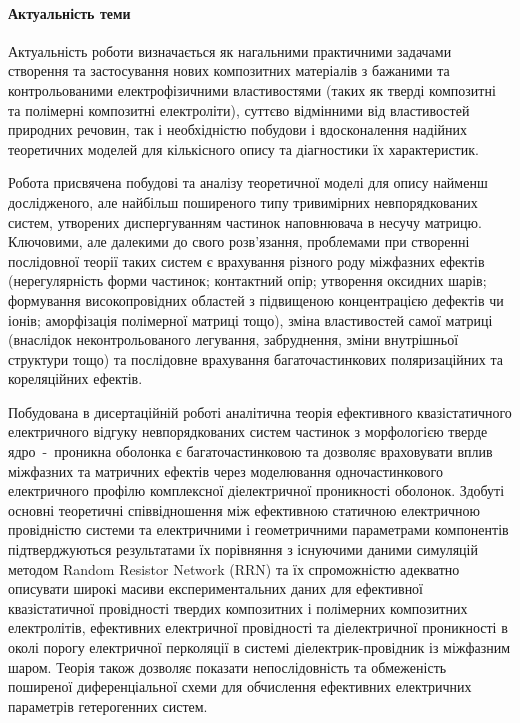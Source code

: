 
\paragraph{Актуальність теми}\hfill\par
Актуальність роботи визначається як нагальними практичними 
задачами створення та застосування нових композитних матеріалів 
з бажаними та контрольованими електрофізичними властивостями 
(таких як тверді композитні та полімерні композитні електроліти), 
суттєво відмінними від властивостей природних речовин, так і 
необхідністю побудови і вдосконалення надійних теоретичних 
моделей для кількісного опису та діагностики їх характеристик. 

Робота присвячена побудові та аналізу теоретичної моделі для 
опису найменш дослідженого, але найбільш поширеного типу 
тривимірних невпорядкованих систем, утворених диспергуванням 
частинок наповнювача в несучу матрицю. Ключовими, але
далекими до свого розв'язан\-ня, проблемами при створенні послідовної 
теорії таких систем є врахування різного роду міжфазних 
ефектів (нерегулярність форми частинок; контактний опір; 
утворення оксидних шарів; формування високопровідних областей 
з підвищеною концентрацією дефектів чи іонів; аморфізація 
полімерної матриці тощо), зміна властивостей самої матриці 
(внаслідок неконтрольованого легування, забруднення, зміни 
внутрішньої структури тощо) та послідовне врахування 
багаточастинкових поляризаційних та кореляційних ефектів.

Побудована в дисертаційній роботі аналітична теорія ефективного 
квазістатичного електричного відгуку невпорядкованих систем
частинок з морфологією тверде ядро~-~проникна оболонка є 
багаточастинковою та дозволяє враховувати вплив міжфазних 
та матричних ефектів через моделювання одночастинкового 
електричного профілю комплексної діелектричної проникності 
оболонок. Здобуті основні теоретичні співвідношення між 
ефективною статичною електричною провідністю системи та 
електричними і геометричними параметрами компонентів 
підтверджуються результатами їх порівняння з існуючими даними 
симуляцій методом Random Resistor Network (RRN) та їх спроможністю 
адекватно описувати широкі масиви експериментальних даних 
для ефективної квазістатичної провідності твердих композитних 
і полімерних композитних електролітів, ефективних електричної 
провідності та діелектричної проникності  в околі порогу 
електричної перколяції в системі діелектрик-провідник із 
міжфазним шаром. Теорія також дозволяє показати непослідовність 
та обмеженість поширеної диференціальної схеми для обчислення 
ефективних електричних параметрів гетерогенних систем.



